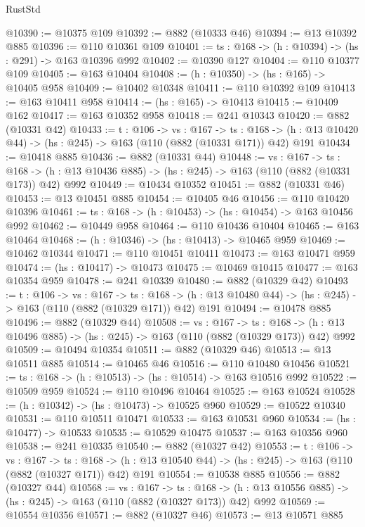 \begin{lexlean}{RustStd}
\begin{coremodule}
@10390 := @10375 @109
@10392 := @882 (@10333 @46)
@10394 := @13 @10392 @885
@10396 := @110 @10361 @109
@10401 := {ts : @168} -> (h : @10394) -> (hs : @291) -> @163 @10396 @992
@10402 := @10390 @127
@10404 := @110 @10377 @109
@10405 := @163 @10404
@10408 := (h : @10350) -> (hs : @165) -> @10405 @958
@10409 := @10402 @10348
@10411 := @110 @10392 @109
@10413 := @163 @10411 @958
@10414 := (hs : @165) -> @10413
@10415 := @10409 @162
@10417 := @163 @10352 @958
@10418 := @241 @10343
@10420 := @882 (@10331 @42)
@10433 := {t : @106} ->
  {vs : @167} ->
  {ts : @168} -> (h : @13 @10420 @44) -> (hs : @245) -> @163 (@110 (@882 (@10331 @171)) @42) @191
@10434 := @10418 @885
@10436 := @882 (@10331 @44)
@10448 := {vs : @167} ->
  {ts : @168} -> (h : @13 @10436 @885) -> (hs : @245) -> @163 (@110 (@882 (@10331 @173)) @42) @992
@10449 := @10434 @10352
@10451 := @882 (@10331 @46)
@10453 := @13 @10451 @885
@10454 := @10405 @46
@10456 := @110 @10420 @10396
@10461 := {ts : @168} -> (h : @10453) -> (hs : @10454) -> @163 @10456 @992
@10462 := @10449 @958
@10464 := @110 @10436 @10404
@10465 := @163 @10464
@10468 := (h : @10346) -> (hs : @10413) -> @10465 @959
@10469 := @10462 @10344
@10471 := @110 @10451 @10411
@10473 := @163 @10471 @959
@10474 := (hs : @10417) -> @10473
@10475 := @10469 @10415
@10477 := @163 @10354 @959
@10478 := @241 @10339
@10480 := @882 (@10329 @42)
@10493 := {t : @106} ->
  {vs : @167} ->
  {ts : @168} -> (h : @13 @10480 @44) -> (hs : @245) -> @163 (@110 (@882 (@10329 @171)) @42) @191
@10494 := @10478 @885
@10496 := @882 (@10329 @44)
@10508 := {vs : @167} ->
  {ts : @168} -> (h : @13 @10496 @885) -> (hs : @245) -> @163 (@110 (@882 (@10329 @173)) @42) @992
@10509 := @10494 @10354
@10511 := @882 (@10329 @46)
@10513 := @13 @10511 @885
@10514 := @10465 @46
@10516 := @110 @10480 @10456
@10521 := {ts : @168} -> (h : @10513) -> (hs : @10514) -> @163 @10516 @992
@10522 := @10509 @959
@10524 := @110 @10496 @10464
@10525 := @163 @10524
@10528 := (h : @10342) -> (hs : @10473) -> @10525 @960
@10529 := @10522 @10340
@10531 := @110 @10511 @10471
@10533 := @163 @10531 @960
@10534 := (hs : @10477) -> @10533
@10535 := @10529 @10475
@10537 := @163 @10356 @960
@10538 := @241 @10335
@10540 := @882 (@10327 @42)
@10553 := {t : @106} ->
  {vs : @167} ->
  {ts : @168} -> (h : @13 @10540 @44) -> (hs : @245) -> @163 (@110 (@882 (@10327 @171)) @42) @191
@10554 := @10538 @885
@10556 := @882 (@10327 @44)
@10568 := {vs : @167} ->
  {ts : @168} -> (h : @13 @10556 @885) -> (hs : @245) -> @163 (@110 (@882 (@10327 @173)) @42) @992
@10569 := @10554 @10356
@10571 := @882 (@10327 @46)
@10573 := @13 @10571 @885

\end{coremodule}
\end{lexlean}

